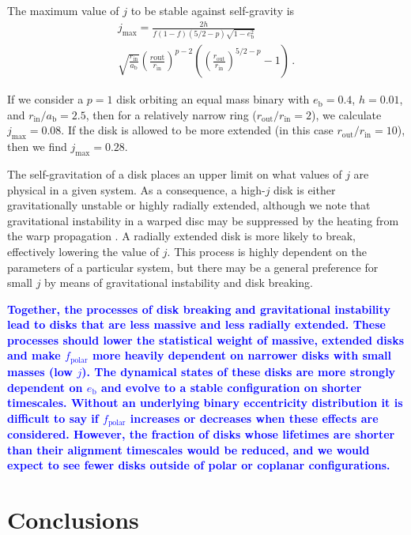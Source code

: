 \documentclass[twocolumn,linenumbers]{aastex631}
\newcommand{\RR}[1]{\textcolor{blue}{\bf#1}} %
\begin{document}
The maximum value of $j$ to be stable against self-gravity is
\begin{multline}
    \label{eq:jmax-shallow}
    j_\text{max} = \frac{2h}{f (1-f) (5/2 - p)\sqrt{1-e_\text{b}^2}}\\ \sqrt{\frac{r_\text{in}}{a_\text{b}}} \left(\frac{r\text{out}}{r_\text{in}}\right)^{p-2} \left( \left( \frac{r_\text{out}}{r_\text{in}} \right)^{5/2 - p}- 1\right)\, .
\end{multline}

If we consider a $p=1$ disk orbiting an equal mass binary with $e_\text{b}=0.4$, $h=0.01$, and $r_\text{in}/a_\text{b}=2.5$, then for a relatively narrow ring ($r_\text{out}/r_\text{in} = 2$), we calculate $j_\text{max} = 0.08$. If the disk is allowed to be more extended (in this case $r_\text{out}/r_\text{in} = 10$), then we find $j_\text{max} = 0.28$.

The self-gravitation of a disk places an upper limit on what values of $j$ are physical in a given system. As a consequence, a high-$j$ disk is either gravitationally unstable or highly radially extended, although we note that gravitational instability in a warped disc may be suppressed by the heating from the warp propagation \citep{rowther2022}.  A radially extended disk is more likely to break, effectively lowering the value of $j$. This process is highly dependent on the parameters of a particular system, but there may be a general preference for small $j$ by means of gravitational instability and disk breaking.

\RR{
    Together, the processes of disk breaking and gravitational instability lead to disks that are less massive and less radially extended. These processes should lower the statistical weight of massive, extended disks and make $f_\text{polar}$ more heavily dependent on narrower disks with small masses (low $j$). The dynamical states of these disks are more strongly dependent on $e_\text{b}$ and evolve to a stable configuration on shorter timescales. Without an underlying binary eccentricity distribution it is difficult to say if $f_\text{polar}$ increases or decreases when these effects are considered. However, the fraction of disks whose lifetimes are shorter than their alignment timescales would be reduced, and we would expect to see fewer disks outside of polar or coplanar configurations. 
}

\section{Conclusions}
\label{sec:conclusions}
\end{document}
